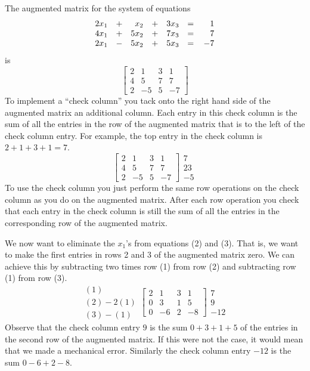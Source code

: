 \begin{example} 
The augmented matrix for the system of equations
\[
\begin{array}{rrrrrrr}
  2x_1&+&x_2&+&3x_3&=\,&1 \\
  4x_1&+&5x_2&+&7x_3&=\,&7\cr
  2x_1&-&5x_2&+&5x_3&=\,&-7\cr
 \end{array} 
\]
is
\[
\left[ \begin{array}{ccc|c} 2&1&3 & 1 \\  4&5&7&7 \\  2&-5 &5 & -7 \end{array} \right]
\]
To implement a ``check column'' you tack onto the right hand side of the 
augmented matrix an additional column. Each entry in this check column is 
the sum of all the entries in the row of the augmented matrix that is to 
the left of the check column entry. For example, the top entry in the check
column is $2+1+3+1=7$.
\[
\left[ \begin{array}{ccc|c} 2&1&3 & 1 \\  4&5&7&7 \\  2&-5 &5 & -7 \end{array} \right]
\begin{array}{c} 7 \\ 23 \\ -5 \end{array} 
\]
To use the check column you just perform the same row
operations on the check column as you do on the augmented matrix. After
each row operation you check that each entry in the check column is
still the sum of all the entries in the corresponding row of the augmented
matrix.

We now want to eliminate the $x_1$'s from equations (2) and (3). That is,
we want to make the first entries in rows 2 and 3 of the augmented matrix
zero. We can achieve this by subtracting two times row (1) from row (2) and 
subtracting row (1) from row (3).
\[
\begin{array}{c} (1) \\ (2)-2(1) \\ (3)-(1) \end{array} 
\left[ \begin{array}{ccc|c} 2&1&3 & 1 \\  0&3&1&5 \\  0&-6 &2 & -8 \end{array} \right]
\begin{array}{c} 7 \\ 9 \\ -12 \end{array} 
\]
Observe that the check column entry $9$ is the sum $0+3+1+5$ 
of the entries in the second row of the augmented matrix. If this were
not the case, it would mean that we made a mechanical error. Similarly
the check column entry $-12$ is the sum $0-6+2-8$.


\end{example}
